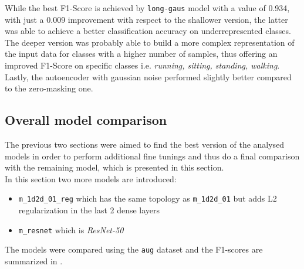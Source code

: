 While the best \mbox{F1-Score} is achieved by \texttt{long-gaus} model with a value of 0.934, with just a 0.009 improvement with respect to the shallower version, the latter was able to achieve a better classification accuracy on underrepresented classes. The deeper version was probably able to build a more complex representation of the input data for classes with a higher number of samples, thus offering an improved \mbox{F1-Score} on specific classes i.e. {\it running, sitting, standing, walking}. Lastly, the autoencoder with gaussian noise performed slightly better compared to the zero-masking one.

\subsection{Overall model comparison}
\label{sec:final_results}
The previous two sections were aimed to find the best version of the analysed models in order to perform additional fine tunings and thus do a final comparison with the remaining model, which is presented in this section.\\
In this section two more models are introduced:
\begin{itemize}
\item \texttt{m_1d2d_01_reg} which has the same topology as \texttt{m_1d2d_01} but adds L2 regularization in the last 2 dense layers
\item \texttt{m_resnet} which is {\it ResNet-50}
\end{itemize}

The models were compared using the \texttt{aug} dataset and the \mbox{F1-scores} are summarized in .

